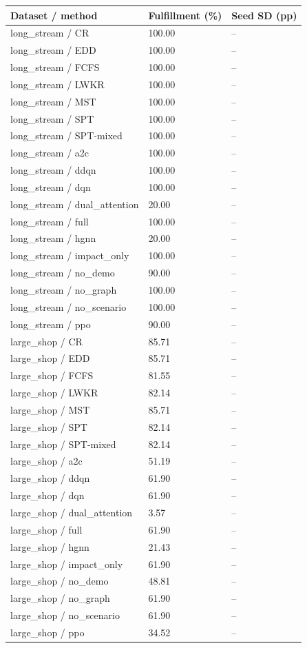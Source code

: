 \begin{tabular}{lll}
\toprule
Dataset / method & Fulfillment (\%) & Seed SD (pp)\\
\midrule
long\_stream / CR & 100.00 & --\\
long\_stream / EDD & 100.00 & --\\
long\_stream / FCFS & 100.00 & --\\
long\_stream / LWKR & 100.00 & --\\
long\_stream / MST & 100.00 & --\\
long\_stream / SPT & 100.00 & --\\
long\_stream / SPT-mixed & 100.00 & --\\
long\_stream / a2c & 100.00 & --\\
long\_stream / ddqn & 100.00 & --\\
long\_stream / dqn & 100.00 & --\\
long\_stream / dual\_attention & 20.00 & --\\
long\_stream / full & 100.00 & --\\
long\_stream / hgnn & 20.00 & --\\
long\_stream / impact\_only & 100.00 & --\\
long\_stream / no\_demo & 90.00 & --\\
long\_stream / no\_graph & 100.00 & --\\
long\_stream / no\_scenario & 100.00 & --\\
long\_stream / ppo & 90.00 & --\\
large\_shop / CR & 85.71 & --\\
large\_shop / EDD & 85.71 & --\\
large\_shop / FCFS & 81.55 & --\\
large\_shop / LWKR & 82.14 & --\\
large\_shop / MST & 85.71 & --\\
large\_shop / SPT & 82.14 & --\\
large\_shop / SPT-mixed & 82.14 & --\\
large\_shop / a2c & 51.19 & --\\
large\_shop / ddqn & 61.90 & --\\
large\_shop / dqn & 61.90 & --\\
large\_shop / dual\_attention & 3.57 & --\\
large\_shop / full & 61.90 & --\\
large\_shop / hgnn & 21.43 & --\\
large\_shop / impact\_only & 61.90 & --\\
large\_shop / no\_demo & 48.81 & --\\
large\_shop / no\_graph & 61.90 & --\\
large\_shop / no\_scenario & 61.90 & --\\
large\_shop / ppo & 34.52 & --\\
\bottomrule
\end{tabular}